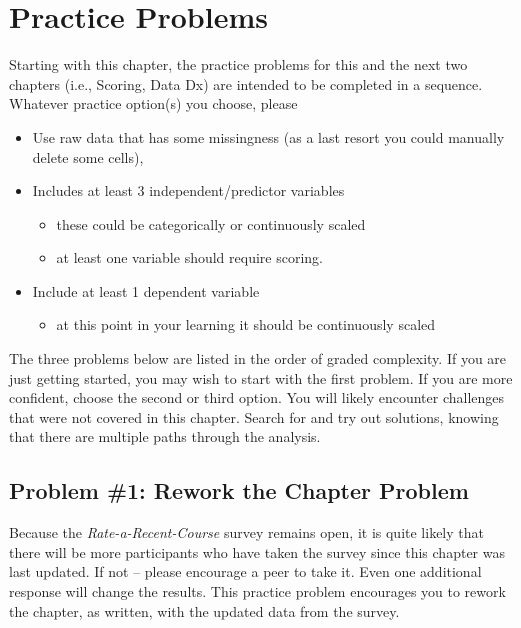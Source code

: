 \documentclass[
  11pt,
]{book}
\providecommand{\tightlist}{%
  \setlength{\itemsep}{0pt}\setlength{\parskip}{0pt}}
\begin{document}
\hypertarget{practice-problems}{%
\section{Practice Problems}\label{practice-problems}}

Starting with this chapter, the practice problems for this and the next two chapters (i.e., Scoring, Data Dx) are intended to be completed in a sequence. Whatever practice option(s) you choose, please

\begin{itemize}
\tightlist
\item
  Use raw data that has some missingness (as a last resort you could manually delete some cells),
\item
  Includes at least 3 independent/predictor variables

  \begin{itemize}
  \tightlist
  \item
    these could be categorically or continuously scaled
  \item
    at least one variable should require scoring.
  \end{itemize}
\item
  Include at least 1 dependent variable

  \begin{itemize}
  \tightlist
  \item
    at this point in your learning it should be continuously scaled
  \end{itemize}
\end{itemize}

The three problems below are listed in the order of graded complexity. If you are just getting started, you may wish to start with the first problem. If you are more confident, choose the second or third option. You will likely encounter challenges that were not covered in this chapter. Search for and try out solutions, knowing that there are multiple paths through the analysis.

\hypertarget{problem-1-rework-the-chapter-problem}{%
\subsection{Problem \#1: Rework the Chapter Problem}\label{problem-1-rework-the-chapter-problem}}

Because the \emph{Rate-a-Recent-Course} survey remains open, it is quite likely that there will be more participants who have taken the survey since this chapter was last updated. If not -- please encourage a peer to take it. Even one additional response will change the results. This practice problem encourages you to rework the chapter, as written, with the updated data from the survey.
\end{document}
